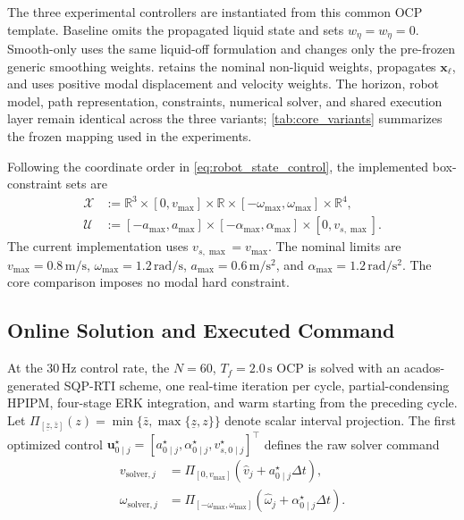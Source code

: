 The three experimental controllers are instantiated from this common OCP
template. Baseline \MPCC{} omits the propagated liquid state and sets
$w_\eta=w_{\dot\eta}=0$. Smooth-only \MPCC{} uses the same liquid-off
formulation and changes only the pre-frozen generic smoothing weights.
\SMPCC{} retains the nominal non-liquid weights, propagates $\bm x_\ell$, and
uses positive modal displacement and velocity weights. The horizon, robot
model, path representation, constraints, numerical solver, and shared execution
layer remain identical across the three variants; \cref{tab:core_variants}
summarizes the frozen mapping used in the experiments.

Following the coordinate order in \cref{eq:robot_state_control}, the
implemented box-constraint sets are
\begin{equation}
\begin{aligned}
  \mathcal X
  &:=\mathbb R^3\times[0,v_{\max}]\times\mathbb R
  \times[-\omega_{\max},\omega_{\max}]\times\mathbb R^4,\\
  \mathcal U
  &:=[-a_{\max},a_{\max}]
  \times[-\alpha_{\max},\alpha_{\max}]
  \times[0,v_{s,\max}].
\end{aligned}
\label{eq:ocp_bounds}
\end{equation}
The current implementation uses \(v_{s,\max}=v_{\max}\). The nominal limits
are \(v_{\max}=0.8\,\mathrm{m/s}\),
\(\omega_{\max}=1.2\,\mathrm{rad/s}\),
\(a_{\max}=0.6\,\mathrm{m/s^2}\), and
\(\alpha_{\max}=1.2\,\mathrm{rad/s^2}\). The core comparison imposes no modal
hard constraint.

\subsection{Online Solution and Executed Command}

At the $30\,\mathrm{Hz}$ control rate, the $N=60$, $T_f=2.0\,\mathrm{s}$ OCP
is solved with an acados-generated SQP-RTI scheme, one real-time iteration per
cycle, partial-condensing HPIPM, four-stage ERK integration, and warm starting
from the preceding cycle. Let
\(\Pi_{[\underline z,\bar z]}(z)=\min\{\bar z,\max\{\underline z,z\}\}\)
denote scalar interval projection. The first optimized control
\(\bm u_{0\mid j}^\star
=[a_{0\mid j}^\star,\alpha_{0\mid j}^\star,v_{s,0\mid j}^\star]^\top\)
defines the raw solver command
\begin{equation}
\begin{aligned}
  v_{\mathrm{solver},j}
  &=\Pi_{[0,v_{\max}]}
  \left(\hat v_j+a_{0\mid j}^\star\Delta t\right),\\
  \omega_{\mathrm{solver},j}
  &=\Pi_{[-\omega_{\max},\omega_{\max}]}
  \left(\hat\omega_j+\alpha_{0\mid j}^\star\Delta t\right).
\end{aligned}
\label{eq:first_action}
\end{equation}

